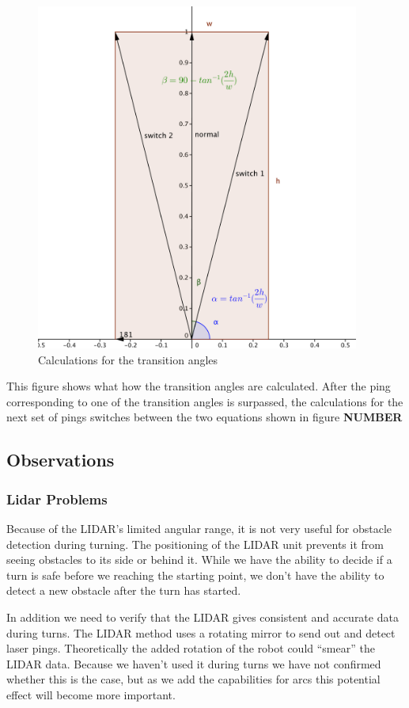 \FloatBarrier
\begin{figure}[h]
  \centering
  \includegraphics[height=4.5in]{look_ahead_bounding_box_transitions.png}
  \caption{Calculations for the transition angles}
\end{figure}
\FloatBarrier

This figure shows what how the transition angles are calculated.
After the ping corresponding to one of the transition angles is surpassed,
the calculations for the next set of pings switches between the two
equations shown in figure {\bf NUMBER} 

\subsection{Observations}

\subsubsection{Lidar Problems}
Because of the LIDAR's limited angular range, it is not very useful
for obstacle detection during turning.  The positioning of the LIDAR
unit prevents it from seeing obstacles to its side or behind it. While
we have the ability to decide if a turn is safe before we reaching the
starting point, we don't
have the ability to detect a new obstacle after the turn has started.

In addition we need to verify that the LIDAR gives consistent and
accurate data during turns.  The LIDAR method uses a rotating mirror
to send out and detect laser pings.\cite{deyle_sick_2008}
Theoretically the added rotation of the robot could ``smear'' the
LIDAR data.  Because we haven't used it during turns we have not
confirmed whether this is the case, but as we add the capabilities for
arcs this potential effect will become more important.

